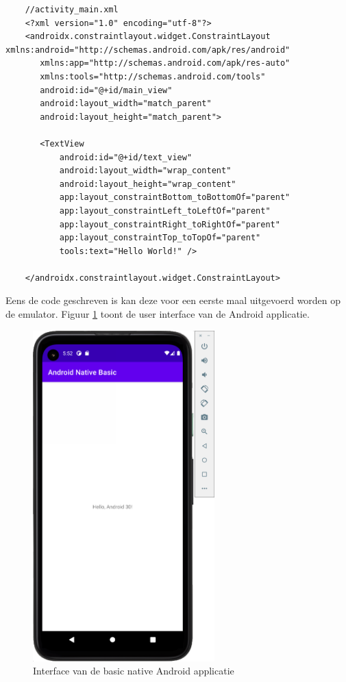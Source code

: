 \begin{lstlisting}
    //activity_main.xml
    <?xml version="1.0" encoding="utf-8"?>
    <androidx.constraintlayout.widget.ConstraintLayout xmlns:android="http://schemas.android.com/apk/res/android"
       xmlns:app="http://schemas.android.com/apk/res-auto"
       xmlns:tools="http://schemas.android.com/tools"
       android:id="@+id/main_view"
       android:layout_width="match_parent"
       android:layout_height="match_parent">
    
       <TextView
           android:id="@+id/text_view"
           android:layout_width="wrap_content"
           android:layout_height="wrap_content"
           app:layout_constraintBottom_toBottomOf="parent"
           app:layout_constraintLeft_toLeftOf="parent"
           app:layout_constraintRight_toRightOf="parent"
           app:layout_constraintTop_toTopOf="parent"
           tools:text="Hello World!" />
                
    </androidx.constraintlayout.widget.ConstraintLayout>
\end{lstlisting}

Eens de code geschreven is kan deze voor een eerste maal uitgevoerd worden op de emulator. Figuur \ref{fig:M-basic-android} toont de user interface van de Android applicatie.

\begin{figure}
    \centering
    \includegraphics[width=7cm]{img/android-basic.png}
    \caption{Interface van de basic native Android applicatie}
    \label{fig:M-basic-android}
\end{figure}

